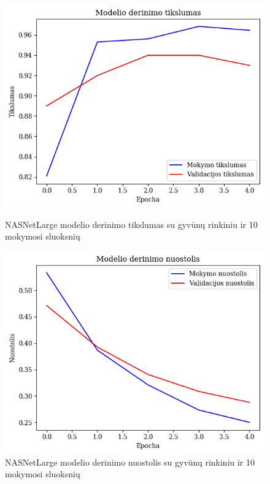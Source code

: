 \documentclass{VUMIFPSbakalaurinis}
\begin{document}
\begin{figure}[!htbp]
    \centering
    \begin{minipage}[b]{0.48\textwidth}
      \includegraphics[width=\textwidth]{img/GrapthsNEW/Large/animal/10/Acc_DC_L_10.png}
      \caption{NASNetLarge modelio derinimo tikslumas su gyvūnų rinkiniu ir 10 mokymosi sluoksnių}
    \end{minipage}
    \hspace{2mm}
    \begin{minipage}[b]{0.48\textwidth}
      \includegraphics[width=\textwidth]{img/GrapthsNEW/Large/animal/10/Loss_DC_L_10.png}
      \caption{NASNetLarge modelio derinimo nuostolis su gyvūnų rinkiniu ir 10 mokymosi sluoksnių}
    \end{minipage}
\end{figure}
\end{document}
